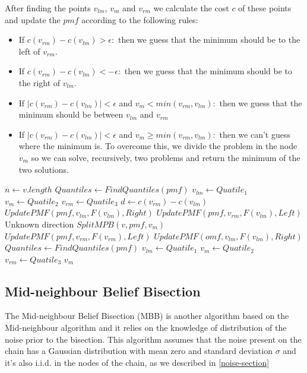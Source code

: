 \documentclass[12pt]{article}
\begin{document}
After finding the points $v_{lm}$, $v_m$ and $v_{rm}$ we calculate the cost $c$ of these points and update the $pmf$ according to the following rules:
\begin{itemize}
    \item{If $c (v_{rm}) - c (v_{lm}) > \epsilon:$} then we guess that the minimum should be to the left of $v_{rm}$.
    \item{If $c (v_{rm}) - c (v_{lm}) < -\epsilon:$} then we guess that the minimum should be to the right of $v_{lm}$.
    \item{If $|c (v_{rm}) - c (v_{lm})| < \epsilon$ and $v_m < {min (v_{rm}, v_{lm})}:$} then we guess that the minimum should be between $v_{lm}$ and $v_{rm}$
    \item{If $|c (v_{rm}) - c (v_{lm})| < \epsilon$ and $v_m \geq {min (v_{rm}, v_{lm})}:$} then we can't guess where the minimum is. To overcome this, we divide the problem in the node $v_m$ so we can solve, recursively, two problems and return the minimum of the two solutions.
\end{itemize}

\begin{algorithm}[H]
\caption{}
\begin{algorithmic}[1]
    \State $n \gets v.length$
    \State $Quantiles \gets FindQuantiles (pmf)$
    \State $v_{lm} \gets Quatile_1$
    \State $v_{m} \gets Quatile_2$
    \State $v_{rm} \gets Quatile_3$
        \State $d \gets c (v_{rm}) - c (v_{lm})$
                \State $UpdatePMF (pmf, v_{lm}, F (v_{lm}), Right)$
                \State $UpdatePMF (pmf, v_{rm}, F (v_{lm}), Left)$
             \Else \Comment Unknown direction
                \State
                \Return $SplitMPB (v, pmf, v_m)$
            \EndIf
                \State $UpdatePMF (pmf, v_{rm}, F (v_{rm}), Left)$
            \Else
                \State $UpdatePMF (omf, v_{lm}, F (v_{lm}), Right)$
        \EndIf
        \State $Quantiles \gets FindQuantiles (pmf)$
        \State $v_{lm} \gets Quatile_1$
        \State $v_{m} \gets Quatile_2$
        \State $v_{rm} \gets Quatile_3$
    \EndWhile
    \State
    \Return $v_m$
\EndProcedure
\end{algorithmic}
\end{algorithm}


\subsection{Mid-neighbour Belief Bisection}
The Mid-neighbour Belief Bisection (MBB) is another algorithm based on the Mid-neighbour algorithm and it relies on the knowledge of distribution of the noise prior to the bisection. This algorithm assumes that the noise present on the chain has a Gaussian distribution with mean zero and standard deviation $\sigma$ and it's also i.i.d. in the nodes of the chain, as we described in \ref{noise-section}
\end{document}
